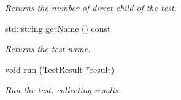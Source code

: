 \begin{DoxyCompactItemize}
\begin{DoxyCompactList}\small\item\em Returns the number of direct child of the test. \end{DoxyCompactList}\item 
std\+::string \hyperlink{class_test_runner_1_1_wrapping_suite_a500c7e2413a4830b87d8ab061251f856}{get\+Name} () const 
\begin{DoxyCompactList}\small\item\em Returns the test name. \end{DoxyCompactList}\item 
\hypertarget{class_test_runner_1_1_wrapping_suite_aa486bfea64b60206ac1d8fbb006f2f64}{void \hyperlink{class_test_runner_1_1_wrapping_suite_aa486bfea64b60206ac1d8fbb006f2f64}{run} (\hyperlink{class_test_result}{Test\+Result} $\ast$result)}\label{class_test_runner_1_1_wrapping_suite_aa486bfea64b60206ac1d8fbb006f2f64}

\begin{DoxyCompactList}\small\item\em Run the test, collecting results. \end{DoxyCompactList}\end{DoxyCompactItemize}
